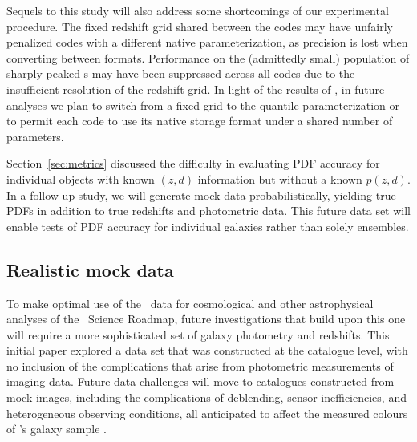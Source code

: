 
Sequels to this study will also address some shortcomings of our experimental procedure.
The fixed redshift grid shared between the codes may have unfairly penalized codes with a different native parameterization, as precision is lost when converting between formats.
Performance on the (admittedly small) population of sharply peaked \pzpdf s may have been suppressed across all codes due to the insufficient resolution of the redshift grid.
In light of the results of \citet[]{Malz:2018}, in future analyses we plan to switch from a fixed grid to the quantile parameterization or to permit each code to use its native storage format under a shared number of parameters.

Section~\ref{sec:metrics} discussed the difficulty in evaluating PDF accuracy for individual objects with known $(z, d)$ information but without a known $p(z, d)$.
In a follow-up study, we will
generate mock data probabilistically, yielding true PDFs in addition to true redshifts and photometric data.
This future data set will enable tests of PDF accuracy for individual galaxies rather than solely ensembles.

\subsection{Realistic mock data}
\label{sec:futuredata}

To make optimal use of the \lsst\ data for cosmological and other astrophysical analyses of the \lsstdesc\ Science Roadmap, future investigations that build upon this one will require a more sophisticated set of galaxy photometry and redshifts.
This initial paper explored a data set that was constructed at the catalogue level, with no inclusion of the complications that arise from photometric measurements of imaging data.
Future data challenges will move to catalogues constructed from mock images, including the complications of deblending, sensor inefficiencies, and heterogeneous observing conditions, all anticipated to affect the measured colours of \lsst's galaxy sample \citep{Dawson:2016}.

